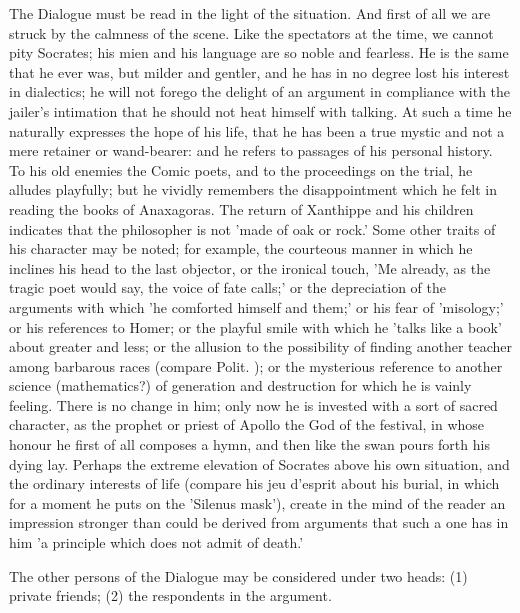 \documentclass[11pt,letter]{article}
\begin{document}
\par  The Dialogue must be read in the light of the situation. And first of all we are struck by the calmness of the scene. Like the spectators at the time, we cannot pity Socrates; his mien and his language are so noble and fearless. He is the same that he ever was, but milder and gentler, and he has in no degree lost his interest in dialectics; he will not forego the delight of an argument in compliance with the jailer's intimation that he should not heat himself with talking. At such a time he naturally expresses the hope of his life, that he has been a true mystic and not a mere retainer or wand-bearer: and he refers to passages of his personal history. To his old enemies the Comic poets, and to the proceedings on the trial, he alludes playfully; but he vividly remembers the disappointment which he felt in reading the books of Anaxagoras. The return of Xanthippe and his children indicates that the philosopher is not 'made of oak or rock.' Some other traits of his character may be noted; for example, the courteous manner in which he inclines his head to the last objector, or the ironical touch, 'Me already, as the tragic poet would say, the voice of fate calls;' or the depreciation of the arguments with which 'he comforted himself and them;' or his fear of 'misology;' or his references to Homer; or the playful smile with which he 'talks like a book' about greater and less; or the allusion to the possibility of finding another teacher among barbarous races (compare Polit. ); or the mysterious reference to another science (mathematics?) of generation and destruction for which he is vainly feeling. There is no change in him; only now he is invested with a sort of sacred character, as the prophet or priest of Apollo the God of the festival, in whose honour he first of all composes a hymn, and then like the swan pours forth his dying lay. Perhaps the extreme elevation of Socrates above his own situation, and the ordinary interests of life (compare his jeu d'esprit about his burial, in which for a moment he puts on the 'Silenus mask'), create in the mind of the reader an impression stronger than could be derived from arguments that such a one has in him 'a principle which does not admit of death.'

\par  The other persons of the Dialogue may be considered under two heads: (1) private friends; (2) the respondents in the argument.
\end{document}
